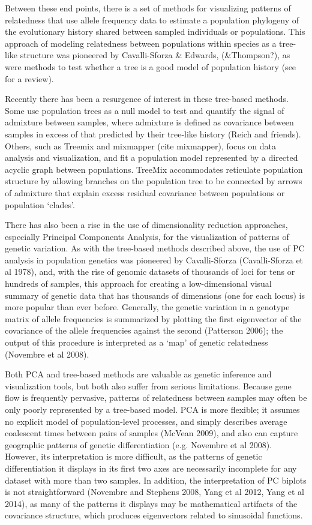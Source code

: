 \documentclass[12pt]{article}
\begin{document}
Between these end points, there is a set of methods for visualizing patterns of relatedness that use allele frequency data to estimate a population phylogeny of the evolutionary history shared between sampled individuals or populations.  This approach of modeling relatedness between populations within species as a tree-like structure was pioneered by Cavalli-Sforza \& Edwards,  (\&Thompson?), as were methods to test whether a tree is a good model of population history \citep{treeness} (see \citep{Felsenstein} for a review).
 
Recently there has been a resurgence of interest in these tree-based methods.  Some use population trees as a null model to test and quantify the signal of admixture between samples, where admixture is defined as covariance between samples in excess of that predicted by their tree-like history (Reich and friends).  Others, such as Treemix \citep{Pickrell} and mixmapper (cite mixmapper), focus on data analysis and visualization, and fit a population model represented by a directed acyclic graph between populations.  TreeMix accommodates reticulate population structure by allowing branches on the population tree to be connected by arrows of admixture that explain excess residual covariance between populations or population `clades'.

There has also been a rise in the use of dimensionality reduction approaches, especially Principal Components Analysis, for the visualization of patterns of genetic variation.  As with the tree-based methods described above, the use of PC analysis in population genetics was pioneered by Cavalli-Sforza (Cavalli-Sforza et al 1978), and, with the rise of genomic datasets of thousands of loci for tens or hundreds of samples, this approach for creating a low-dimensional visual summary of genetic data that has thousands of dimensions (one for each locus) is more popular than ever before.  Generally, the genetic variation in a genotype matrix of allele frequencies is summarized by plotting the first eigenvector of the covariance of the allele frequencies against the second (Patterson 2006); the output of this procedure is interpreted as a `map' of genetic relatedness (Novembre et al 2008).

Both PCA and tree-based methods are valuable as genetic inference and visualization tools, but both also suffer from serious limitations.  Because gene flow is frequently pervasive, patterns of relatedness between samples may often be only poorly represented by a tree-based model.  PCA is more flexible; it assumes no explicit model of population-level processes, and simply describes average coalescent times between pairs of samples (McVean 2009), and also can capture geographic patterns of genetic differentiation (e.g. Novembre et al 2008).  However, its interpretation is more difficult, as the patterns of genetic differentiation it displays in its first two axes are necessarily incomplete for any dataset with more than two samples.  In addition, the interpretation of PC biplots is not straightforward (Novembre and Stephens 2008, Yang et al 2012, Yang et al 2014), as many of the patterns it displays may be mathematical artifacts of the covariance structure, which produces eigenvectors related to sinusoidal functions.
\end{document}
